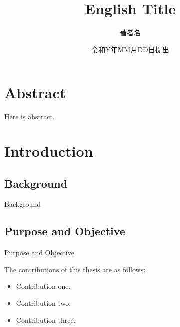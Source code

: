\documentclass[12pt,dvipdfmx]{report}
\newcommand{\controne}[1]{\color{red} #1 \color{black}}
\newcommand{\contrtwo}[1]{\color{green} #1 \color{black}}
\newcommand{\contrthree}[1]{\color{blue} #1 \color{black}}
\newcommand{\controne}[1]{#1}
\newcommand{\contrtwo}[1]{#1}
\newcommand{\contrthree}[1]{#1}
\begin{document}

\title{English Title}
\author{著者名}
\date{令和Y年MM月DD日提出}
\maketitle


\chapter*{Abstract}
Here is abstract.


\tableofcontents

\listoffigures
{}

\listoftables
{}


\chapter{Introduction}
\setcounter{page}{1}


\section{Background}

Background

\section{Purpose and Objective}

Purpose and Objective

The contributions of this thesis are as follows:
\begin{itemize}
    \item \controne{Contribution one.}
    \item \contrtwo{Contribution two.}
    \item \contrthree{Contribution three.}
\end{itemize}
\end{document}
